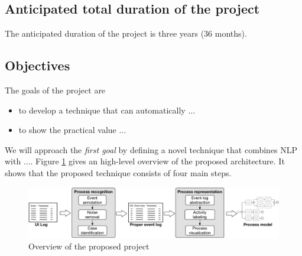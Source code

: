  \subsection{Anticipated total duration of the project}

The anticipated duration of the project is three years (36 months).

\subsection{Objectives}
\label{sec:objectives}

The goals of the project are 

\begin{itemize}
\item to develop a technique that can automatically ...   

\item to show the practical value ... 
\end{itemize}

We will approach the \textit{first goal} by defining a novel technique that combines NLP with .... Figure \ref{fig:approach} gives an high-level overview of the proposed architecture. It shows that the proposed technique consists of four main steps.    

\begin{figure}[h!]
\centering
\includegraphics[width=\textwidth]{figures/overview.pdf}
\caption{Overview of the proposed project}
\label{fig:approach}
\end{figure}





